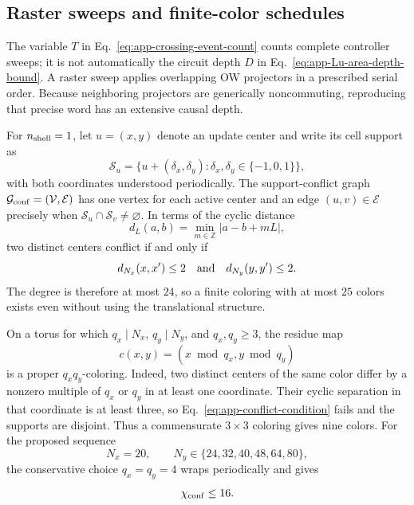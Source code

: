 \subsection{Raster sweeps and finite-color schedules}

The variable \(T\) in Eq.~\eqref{eq:app-crossing-event-count} counts complete
controller sweeps; it is not automatically the circuit depth \(D\) in
Eq.~\eqref{eq:app-Lu-area-depth-bound}.  A raster sweep applies overlapping
OW projectors in a prescribed serial order.  Because neighboring projectors
are generically noncommuting, reproducing that precise word has an extensive
causal depth.

For \(n_{\rm shell}=1\), let \(u=(x,y)\) denote an update center and write its
cell support as
\begin{equation}
    \mathcal S_u
    =\bigl\{u+(\delta_x,\delta_y):
      \delta_x,\delta_y\in\{-1,0,1\}\bigr\},
    \label{eq:app-nshell-one-support}
\end{equation}
with both coordinates understood periodically.  The support-conflict graph
\(\mathcal G_{\rm conf}=(\mathcal V,\mathcal E)\) has one vertex for each
active center and an edge \((u,v)\in\mathcal E\) precisely when
\(\mathcal S_u\cap\mathcal S_v\ne\varnothing\).  In terms of the cyclic
distance
\begin{equation}
    d_L(a,b)=\min_{m\in\mathbb Z}|a-b+mL|,
\end{equation}
two distinct centers conflict if and only if
\begin{equation}
    d_{N_x}(x,x')\le2
    \quad\hbox{and}\quad
    d_{N_y}(y,y')\le2.
    \label{eq:app-conflict-condition}
\end{equation}
The degree is therefore at most \(24\), so a finite coloring with at most
\(25\) colors exists even without using the translational structure.

On a torus for which \(q_x\mid N_x\), \(q_y\mid N_y\), and
\(q_x,q_y\ge3\), the residue map
\begin{equation}
    c(x,y)=(x\bmod q_x,y\bmod q_y)
    \label{eq:app-residue-coloring}
\end{equation}
is a proper \(q_xq_y\)-coloring.  Indeed, two distinct centers of the same
color differ by a nonzero multiple of \(q_x\) or \(q_y\) in at least one
coordinate.  Their cyclic separation in that coordinate is at least three,
so Eq.~\eqref{eq:app-conflict-condition} fails and the supports are disjoint.
Thus a commensurate \(3\times3\) coloring gives nine colors.  For the proposed
sequence
\begin{equation}
    N_x=20,
    \qquad N_y\in\{24,32,40,48,64,80\},
\end{equation}
the conservative choice \(q_x=q_y=4\) wraps periodically and gives
\begin{equation}
    \chi_{\rm conf}\le16.
    \label{eq:app-sixteen-color-bound}
\end{equation}

